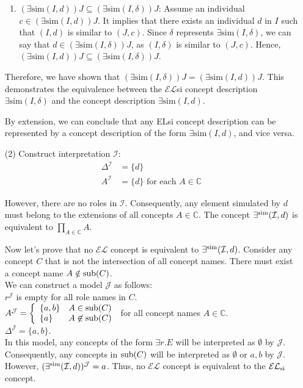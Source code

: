 \documentclass[12pt]{article}
\def \I {\mathcal{I}}
\begin{document}
\begin{enumerate}
\begin{enumerate}
  \item $(\exists \text{sim}(I, d))J \subseteq (\exists \text{sim}(I, \delta))J$: Assume an individual $c \in (\exists \text{sim}(I, d))J$. It implies that there exists an individual $d$ in $I$ such that $(I, d)$ is similar to $(J, c)$. Since $\delta$ represents $\exists \text{sim}(I, \delta)$, we can say that $d \in (\exists \text{sim}(I, \delta))J$, as $(I, \delta)$ is similar to $(J, c)$. Hence, $(\exists \text{sim}(I, d))J \subseteq (\exists \text{sim}(I, \delta))J$.
\end{enumerate}

Therefore, we have shown that $(\exists \text{sim}(I, \delta))J = (\exists \text{sim}(I, d))J$. This demonstrates the equivalence between the $\mathcal{EL}$si concept description $\exists \text{sim}(I, \delta)$ and the concept description $\exists \text{sim}(I, d)$.

By extension, we can conclude that any ELsi concept description can be represented by a concept description of the form $\exists \text{sim}(I, d)$, and vice versa.


        \item [(2)]
        Construct interpretation $\I$: 
        \begin{align*}
            \Delta^{\mathcal{I}} &= \{d\} \\
            A^\mathcal{I} &= \{d\} \text{ for each } A \in \mathbb{C}
        \end{align*}\par
        However, there are no roles in $ \mathcal{I} $. Consequently, any element simulated by $ d $ must belong to the extensions of all concepts $ A\in\mathbb{C} $. The concept $ \exists^{\rm sim}(\mathcal{I}, d) $ is equivalent to $ \prod\limits_{A\in\mathbb{C}}A $.

Now let's prove that no $ \mathcal{EL} $ concept is equivalent to $ \exists^{\rm sim}(\mathcal{I}, d) $. Consider any concept $ C $ that is not the intersection of all concept names. There must exist a concept name $ A \notin {\rm sub}(C) $. \\
We can construct a model $ \mathcal{J} $ as follows: \\
$r^{\mathcal{J}}$ is empty for all role names in $ C $. \\
$A^{\mathcal{J}} = \left\{\begin{array}{ll}
\{a, b\} & A\in {\rm sub}(C)\\
\{a\} & A \not \in {\rm sub}(C)
\end{array}\right. $ for all concept names $ A \in \mathbb{C} $. \\
$ \Delta^{\mathcal{J}} = \{a, b\} $. \\
In this model, any concepts of the form $ \exists r.E $ will be interpreted as $ \emptyset $ by $ \mathcal{J} $. Consequently, any concepts in $ {\rm sub}(C) $ will be interpreted as $ \emptyset $ or $ {a, b} $ by $ \mathcal{J} $. However, $ (\exists^{\rm sim}(\mathcal{I}, d))^{\mathcal{J}} = { a } $. Thus, no $ \mathcal{EL} $ concept is equivalent to the $ \mathcal{EL}_{\rm si} $ concept.


\end{enumerate}
\end{document}
